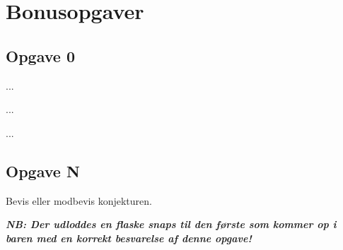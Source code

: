 \section{\huge{Bonusopgaver}}

\setlength{\parindent}{3mm}

\subsection{Opgave 0}

...

\newpage

...

\newpage

...

\newpage

\subsection{Opgave N}

Bevis eller modbevis konjekturen.

\vspace{.1in} \textbf{\emph{NB: Der udloddes en flaske snaps til den første som
    kommer op i baren med en korrekt besvarelse af denne opgave!}}


\setlength{\parindent}{0mm}
